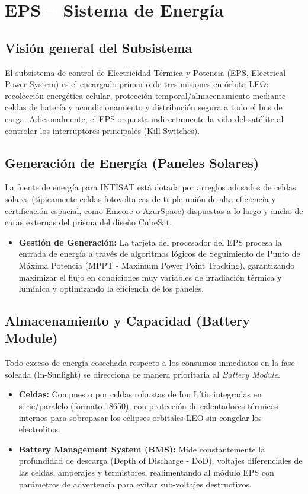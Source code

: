 \chapter{EPS – Sistema de Energía}

\section{Visión general del Subsistema}
El subsistema de control de Electricidad Térmica y Potencia (EPS, Electrical Power System) es el encargado primario de tres misiones en órbita LEO: recolección energética celular, protección temporal/almacenamiento mediante celdas de batería y acondicionamiento y distribución segura a todo el bus de carga. Adicionalmente, el EPS orquesta indirectamente la vida del satélite al controlar los interruptores principales (Kill-Switches).

\section{Generación de Energía (Paneles Solares)}
La fuente de energía para INTISAT está dotada por arreglos adosados de celdas solares (típicamente celdas fotovoltaicas de triple unión de alta eficiencia y certificación espacial, como Emcore o AzurSpace) dispuestas a lo largo y ancho de caras externas del prisma del diseño CubeSat.
\begin{itemize}
    \item \textbf{Gestión de Generación:} La tarjeta del procesador del EPS procesa la entrada de energía a través de algoritmos lógicos de Seguimiento de Punto de Máxima Potencia (MPPT - Maximum Power Point Tracking), garantizando maximizar el flujo en condiciones muy variables de irradiación térmica y lumínica y optimizando la eficiencia de los paneles.
\end{itemize}

\section{Almacenamiento y Capacidad (Battery Module)}
Todo exceso de energía cosechada respecto a los consumos inmediatos en la fase soleada (In-Sunlight) se direcciona de manera prioritaria al \textit{Battery Module}. 
\begin{itemize}
    \item \textbf{Celdas:} Compuesto por celdas robustas de Ion Lítio integradas en serie/paralelo (formato 18650), con protección de calentadores térmicos internos para sobrepasar los eclipses orbitales LEO sin congelar los electrolitos.
    \item \textbf{Battery Management System (BMS):} Mide constantemente la profundidad de descarga (Depth of Discharge - DoD), voltajes diferenciales de las celdas, amperajes y termistores, realimentando al módulo EPS con parámetros de advertencia para evitar sub-voltajes destructivos.
\end{itemize}

